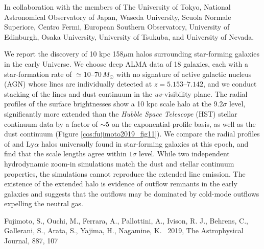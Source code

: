 \vspace{3pt}

\noindent
In collaboration with the members of
\noindent
The University of Tokyo, 
National Astronomical Observatory of Japan, 
Waseda University, 
Scuola Normale Superiore, 
Centro Fermi, 
European Southern Observatory, 
University of Edinburgh, 
Osaka University, 
University of Tsukuba, 
and 
University of Nevada. 

\vspace{10pt}

We report the discovery of 10 kpc {\sc [Cii]} 158$\mu$m halos 
surrounding star-forming galaxies in the early Universe. 
We choose deep ALMA data of 18 galaxies, 
each with a star-formation rate of $\simeq 10$--$70\,M_\odot$ 
with no signature of 
active galactic nucleus (AGN) 
whose {\sc [Cii]} lines are individually detected at $z=5.153$--$7.142$,
and we conduct stacking of the {\sc [Cii]} lines and dust continuum 
in the $uv$-visibility plane. 
The radial profiles of the surface brightnesses show a 10 kpc scale {\sc [Cii]} halo 
at the 9.2$\sigma$ level, significantly more extended than the 
\textit{Hubble Space Telescope} (HST) stellar continuum data
by a factor of $\sim5$ on the exponential-profile basis, as well as the dust continuum 
(Figure \ref{cos:fujimoto2019_fig11}).
We compare the radial profiles of {\sc [Cii]} and Ly$\alpha$ halos
universally found in star-forming galaxies at this epoch, 
and find that the scale lengths agree within $1\sigma$ level.
While two independent hydrodynamic zoom-in simulations match the dust and stellar continuum properties, 
the simulations cannot reproduce the extended {\sc [Cii]} line emission.
The existence of the extended {\sc [Cii]} halo is evidence of outflow remnants in the early galaxies 
and suggests that the outflows may be dominated by cold-mode outflows expelling the neutral gas. 


\begin{thebibliography}{9}
Fujimoto, S., Ouchi, M., Ferrara, A., Pallottini, A., Ivison, R. J., Behrens, C., Gallerani, S., Arata, S., Yajima, H., Nagamine, K. 
\ 2019, 
The Astrophysical Journal, 887, 107 
\end{thebibliography}



